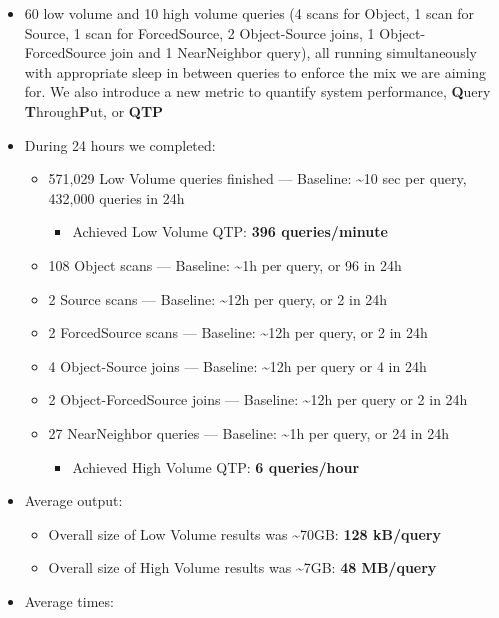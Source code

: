 \documentclass[DM,toc]{lsstdoc}
\begin{document}
\begin{itemize}
\item
  60 low volume and 10 high volume queries (4 scans for Object, 1 scan
  for Source, 1 scan for ForcedSource, 2 Object-Source joins, 1
  Object-ForcedSource join and 1 NearNeighbor query), all running
  simultaneously with appropriate sleep in between queries to enforce
  the mix we are aiming for. We also introduce a new metric to quantify
  system performance, \textbf{Q}uery \textbf{T}hrough\textbf{P}ut, or
  \textbf{QTP}
\item
  During 24 hours we completed:

  \begin{itemize}
  \item
    571,029 Low Volume queries finished --- Baseline:
    \textasciitilde{}10 sec per query, 432,000 queries in 24h

    \begin{itemize}
    \item
      Achieved Low Volume QTP: \textbf{396 queries/minute}
    \end{itemize}
  \item
    108 Object scans --- Baseline: \textasciitilde{}1h per query, or 96
    in 24h
  \item
    2 Source scans --- Baseline: \textasciitilde{}12h per query, or 2 in
    24h
  \item
    2 ForcedSource scans --- Baseline: \textasciitilde{}12h per query,
    or 2 in 24h
  \item
    4 Object-Source joins --- Baseline: \textasciitilde{}12h per query
    or 4 in 24h
  \item
    2 Object-ForcedSource joins --- Baseline: \textasciitilde{}12h per
    query or 2 in 24h
  \item
    27 NearNeighbor queries --- Baseline: \textasciitilde{}1h per query,
    or 24 in 24h

    \begin{itemize}
    \item
      Achieved High Volume QTP: \textbf{6 queries/hour}
    \end{itemize}
  \end{itemize}
\item
  Average output:

  \begin{itemize}
  \item
    Overall size of Low Volume results was \textasciitilde{}70GB:
    \textbf{128 kB/query}
  \item
    Overall size of High Volume results was \textasciitilde{}7GB:
    \textbf{48 MB/query}
  \end{itemize}
\item
  Average times:


\end{itemize}
\end{document}
